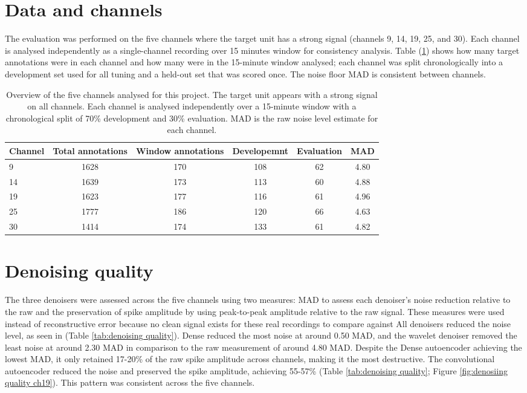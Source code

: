 \documentclass[ %
                    author={Rzan Alkabier},
                    supervisor={Dr. Zahraa Abdallah},
                    degree={MSc},
                     title={Denoising Extracellular Recording for Spike Detection and Classification on Single Channels},
                    subtitle={Does denoising improve detection and classification performance?},
                      type={},
                      year={2026}]{dissertation}
\begin{document}
\section{Data and channels}
The evaluation was performed on the five channels where the target unit has a strong signal (channels 9, 14, 19, 25, and 30). Each channel is analysed independently as a single-channel recording over 15 minutes window for consistency analysis. Table (\ref{tab:channel data overview}) shows how many target annotations were in each channel and how many were in the 15-minute window analysed; each channel was split chronologically into a development set used for all tuning and a held-out set that was scored once. The noise floor MAD is consistent between channels. 
\begin{table}[htbp]
    \centering
    \begin{tabular}{lccccc}
    Channel & Total annotations & Window annotations & Developemnt & Evaluation & MAD \\
    \toprule
    9 & 1628 & 170 & 108 & 62 & 4.80 \\
    14 & 1639 & 173 & 113 & 60 & 4.88 \\
    19 & 1623 & 177 & 116 & 61 & 4.96 \\
    25 & 1777 & 186 & 120 & 66 & 4.63 \\
    30 & 1414 & 174 & 133 & 61 & 4.82 \\
    \bottomrule
    \end{tabular}
    \caption{Overview of the five channels analysed for this project. The target unit appears with a strong signal on all channels. Each channel is analysed independently over a 15-minute window with a chronological split of 70\% development and 30\% evaluation. MAD is the raw noise level estimate for each channel.}
    \label{tab:channel data overview}
\end{table}
\section{Denoising quality}
The three denoisers were assessed across the five channels using two measures: MAD to assess each denoiser's noise reduction relative to the raw and the preservation of spike amplitude by using peak-to-peak amplitude relative to the raw signal. These measures were used instead of reconstructive error because no clean signal exists for these real recordings to compare against \cite{baldazzi_systematic_2020, adam_comparative_2025}
All denoisers reduced the noise level, as seen in (Table \ref{tab:denoising quality}). Dense reduced the most noise at around 0.50 MAD, and the wavelet denoiser removed the least noise at around 2.30 MAD in comparison to the raw measurement of around 4.80 MAD. Despite the Dense autoencoder achieving the lowest MAD, it only retained 17-20\% of the raw spike amplitude across channels, making it the most destructive. The convolutional autoencoder reduced the noise and preserved the spike amplitude, achieving 55-57\% (Table \ref{tab:denoising quality}; Figure \ref{fig:denosiing quality ch19}). This pattern was consistent across the five channels. 
\end{document}
